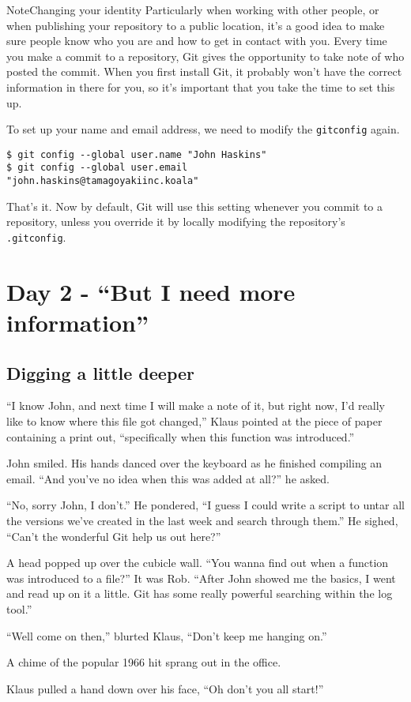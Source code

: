 \begin{callout}{Note}{Changing your identity}
Particularly when working with other people, or when publishing your repository to a public location, it's a good idea to make sure people know who you are and how to get in contact with you.  Every time you make a commit to a repository, Git gives the opportunity to take note of who posted the commit.  When you first install Git, it probably won't have the correct information in there for you, so it's important that you take the time to set this up.

To set up your name and email address, we need to modify the \texttt{gitconfig} again.  

\begin{Verbatim}
$ git config --global user.name "John Haskins"
$ git config --global user.email 
"john.haskins@tamagoyakiinc.koala"
\end{Verbatim}

That's it.  Now by default, Git will use this setting whenever you commit to a repository, unless you override it by locally modifying the repository's \texttt{.gitconfig}.
\end{callout}

\section{Day 2 - ``But I need more information''}
\subsection{Digging a little deeper}

\begin{trenches}
``I know John, and next time I will make a note of it, but right now, I'd really like to know where this file got changed,'' Klaus pointed at the piece of paper containing a print out, ``specifically when this function was introduced.''

John smiled.  His hands danced over the keyboard as he finished compiling an email.  ``And you've no idea when this was added at all?'' he asked.

``No, sorry John, I don't.''  He pondered, ``I guess I could write a script to untar all the versions we've created in the last week and search through them.''  He sighed, ``Can't the wonderful Git help us out here?''

A head popped up over the cubicle wall.  ``You wanna find out when a function was introduced to a file?''  It was Rob.  ``After John showed me the basics, I went and read up on it a little.  Git has some really powerful searching within the log tool.''

``Well come on then,'' blurted Klaus, ``Don't keep me hanging on.''

A chime of the popular 1966 hit sprang out in the office.

Klaus pulled a hand down over his face, ``Oh don't you all start!''
\end{trenches}

